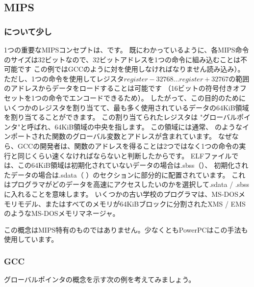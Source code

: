 \subsection{MIPS}

\subsubsection{について少し}
\label{MIPS_GP}


1つの重要なMIPSコンセプトは、です。
既にわかっているように、各MIPS命令のサイズは32ビットなので、32ビットアドレスを1つの命令に組み込むことは不可能です
この例ではGCCのように対を使用しなければなりません読み込み）。
ただし、1つの命令を使用してレジスタ$register-32768...register+32767$の範囲のアドレスからデータをロードすることは可能です
（16ビットの符号付きオフセットを1つの命令でエンコードできるため）。
したがって、この目的のためにいくつかのレジスタを割り当てて、最も多く使用されているデータの64KiB領域を割り当てることができます。
この割り当てられたレジスタは "グローバルポインタ"と呼ばれ、64KiB領域の中央を指します。
この領域には通常、 \printf のようなインポートされた関数のグローバル変数とアドレスが含まれています。
なぜなら、GCCの開発者は、関数のアドレスを得ることは2つではなく1つの命令の実行と同じくらい速くなければならないと判断したからです。 
ELFファイルでは、この64KiB領域は初期化されていないデータの場合は.sbss（）、
初期化されたデータの場合は.sdata（ ）のセクションに部分的に配置されています。
これはプログラマがどのデータを高速にアクセスしたいのかを選択して.sdata / .sbssに入れることを意味します。
いくつかの古い学校のプログラマは、MS-DOSメモリモデル、またはすべてのメモリが64KiBブロックに分割されたXMS / EMSのようなMS-DOSメモリマネージャ。


この概念はMIPS特有のものではありません。少なくともPowerPCはこの手法も使用しています。

\subsubsection{\Optimizing GCC}

グローバルポインタの概念を示す次の例を考えてみましょう。



